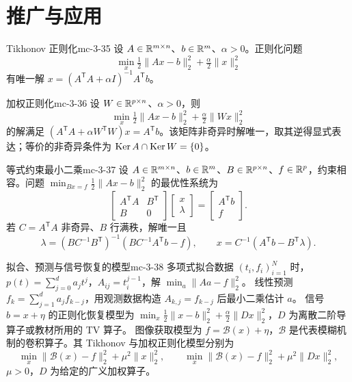\section{推广与应用}

\begin{definition}{Tikhonov 正则化}{mc-3-35}
设 $A\in\mathbb{R}^{m\times n}$、$b\in\mathbb{R}^m$、$\alpha>0$。正则化问题
\[\min_x\tfrac12\|Ax-b\|_2^2+\tfrac\alpha2\|x\|_2^2\]
有唯一解 $x=(A^{\mathsf T}A+\alpha I)^{-1}A^{\mathsf T}b$。
\end{definition}

\begin{proposition}{加权正则化}{mc-3-36}
设 $W\in\mathbb{R}^{p\times n}$、$\alpha>0$，则
\[\min_x\tfrac12\|Ax-b\|_2^2+\tfrac\alpha2\|Wx\|_2^2\]
的解满足 $(A^{\mathsf T}A+\alpha W^{\mathsf T}W)x=A^{\mathsf T}b$。该矩阵非奇异时解唯一，取其逆得显式表达；等价的非奇异条件为 $\operatorname{Ker} A\cap\operatorname{Ker} W=\{0\}$。
\end{proposition}

\begin{proposition}{等式约束最小二乘}{mc-3-37}
设 $A\in\mathbb{R}^{m\times n}$、$b\in\mathbb{R}^m$、$B\in\mathbb{R}^{p\times n}$、$f\in\mathbb{R}^p$，约束相容。问题 $\min_{Bx=f}\tfrac12\|Ax-b\|_2^2$ 的最优性系统为
\[\begin{bmatrix}A^{\mathsf T}A&B^{\mathsf T}\\B&0\end{bmatrix}\begin{bmatrix}x\\\lambda\end{bmatrix}=\begin{bmatrix}A^{\mathsf T}b\\f\end{bmatrix}.\]
若 $C=A^{\mathsf T}A$ 非奇异、$B$ 行满秩，解唯一且
\[\lambda=(BC^{-1}B^{\mathsf T})^{-1}(BC^{-1}A^{\mathsf T}b-f),\qquad
x=C^{-1}(A^{\mathsf T}b-B^{\mathsf T}\lambda).\]
\end{proposition}

\begin{proposition}{拟合、预测与信号恢复的模型}{mc-3-38}
多项式拟合数据 $(t_i,f_i)_{i=1}^N$ 时，$p(t)=\sum_{j=0}^d a_jt^j$，$A_{ij}=t_i^{j-1}$，解 $\min_a\|Aa-f\|_2^2$。
线性预测 $f_k=\sum_{j=1}^d a_jf_{k-j}$，用观测数据构造 $A_{k,j}=f_{k-j}$ 后最小二乘估计 $a$。
信号 $b=x+\eta$ 的正则化恢复模型为 $\min_x\tfrac12\|x-b\|_2^2+\tfrac\alpha2\|Dx\|_2^2$，$D$ 为离散二阶导算子或教材所用的 TV 算子。
图像获取模型为 $f=\mathcal B(x)+\eta$，$\mathcal B$ 是代表模糊机制的卷积算子。其 Tikhonov 与加权正则化模型分别为
\[\min_x\|\mathcal B(x)-f\|_2^2+\mu^2\|x\|_2^2,\qquad
\min_x\|\mathcal B(x)-f\|_2^2+\mu^2\|Dx\|_2^2,\]
$\mu>0$，$D$ 为给定的广义加权算子。
\end{proposition}
